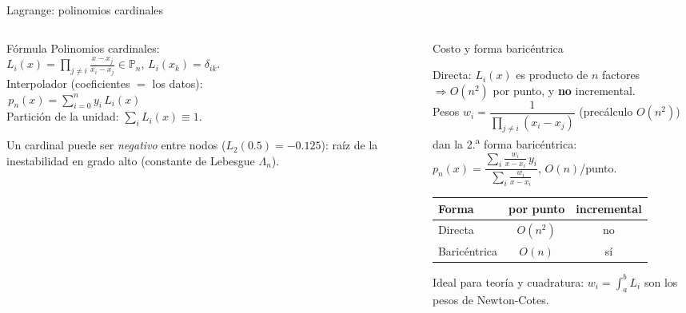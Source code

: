 \documentclass[aspectratio=169,10pt]{beamer}
\begin{document}
\begin{frame}{Lagrange: polinomios cardinales}
\begin{columns}[T]
\begin{column}{0.48\textwidth}
\begin{cardidea}{Fórmula}{\faSuperscript}
{\footnotesize Polinomios cardinales:\\[0.4mm]
$L_i(x)=\displaystyle\prod_{j\neq i}\frac{x-x_j}{x_i-x_j}\in\mathbb P_n$, \quad $L_i(x_k)=\delta_{ik}$.\\[1.4mm]
Interpolador (coeficientes $=$ los datos):\\[0.2mm]
$\boxed{\,p_n(x)=\displaystyle\sum_{i=0}^n y_i\,L_i(x)\,}$\\[1.2mm]
Partición de la unidad: $\displaystyle\sum_i L_i(x)\equiv1$.}
\end{cardidea}
\vspace{1mm}
\begin{cardnota}[\faExclamationTriangle]
{\footnotesize Un cardinal puede ser \emph{negativo} entre nodos ($L_2(0.5)=-0.125$): raíz de la inestabilidad en grado alto (constante de Lebesgue $\Lambda_n$).}
\end{cardnota}
\end{column}
\begin{column}{0.50\textwidth}
\begin{cardgear}{Costo y forma baricéntrica}{\faTable}
{\footnotesize Directa: $L_i(x)$ es producto de $n$ factores $\Rightarrow O(n^2)$ por punto, y \textbf{no} incremental.\\[1.0mm]
Pesos $w_i=\dfrac{1}{\prod_{j\neq i}(x_i-x_j)}$ (precálculo $O(n^2)$) dan la 2.\textsuperscript{a} forma baricéntrica:\\[0.4mm]
$p_n(x)=\dfrac{\sum_i \frac{w_i}{x-x_i}\,y_i}{\sum_i \frac{w_i}{x-x_i}}$, \; $O(n)$/punto.\\[1.0mm]
\centering
\renewcommand{\arraystretch}{1.14}\setlength{\tabcolsep}{6pt}
\begin{tabular}{l|cc}
Forma & por punto & incremental\\\hline
Directa & $O(n^2)$ & no\\
Baricéntrica & $O(n)$ & sí\\
\end{tabular}}
\end{cardgear}
\vspace{1mm}
\begin{cardnota}[\faInfoCircle]
{\footnotesize Ideal para teoría y cuadratura: $w_i=\int_a^b L_i$ son los pesos de Newton-Cotes.}
\end{cardnota}
\end{column}
\end{columns}
\end{frame}
\end{document}
